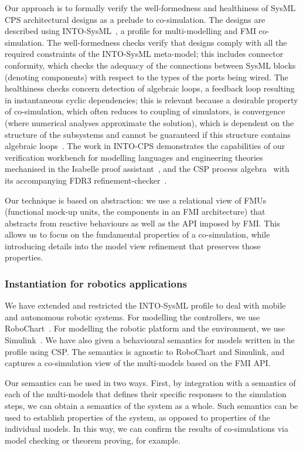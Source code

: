 Our approach is to formally verify the well-formedness and healthiness of SysML CPS architectural designs as a prelude to co-simulation. The designs are described using INTO-SysML~\cite{INTO-CPS-D2.1a-2015}, a profile for multi-modelling and FMI co-simulation. The well-formedness checks verify that designs comply with all the required constraints of the INTO-SysML meta-model; this includes connector conformity, which checks the adequacy of the connections between SysML blocks (denoting components) with respect to the types of the ports being wired. The healthiness checks concern detection of algebraic loops, a feedback loop resulting in instantaneous cyclic dependencies; this is relevant because a desirable property of co-simulation, which often reduces to coupling of simulators, is convergence (where numerical analyses approximate the solution), which is dependent on the structure of the subsystems and cannot be guaranteed if this structure contains algebraic loops~\cite{KublerS2000,BromanBGLMTW2013}. The work in INTO-CPS demonstrates the capabilities of our verification workbench for modelling languages and engineering theories mechanised in the Isabelle proof assistant~\cite{NipkowK2014}, and the CSP process algebra~\cite{Hoare1985} with its accompanying FDR3 refinement-checker~\cite{GibsonRobinsonABR2016}.

Our technique is based on abstraction: we use a relational view of FMUs (functional mock-up units, the components in an FMI architecture) that abstracts from reactive behaviours as well as the API imposed by FMI. This allows us to focus on the fundamental properties of a co-simulation, while introducing details into the model view refinement that preserves those properties.

\subsubsection{Instantiation for robotics applications}

We have extended and restricted the INTO-SysML profile to deal with mobile and autonomous robotic systems. For modelling the controllers, we use RoboChart~\cite{LiMRCWT2017}. For modelling the robotic platform and the environment, we use Simulink~\cite{MathworksURL}. We have also given a behavioural semantics for models written in the profile using CSP. The semantics is agnostic to RoboChart and Simulink, and captures a co-simulation view of the multi-models based on the FMI API.

Our semantics can be used in two ways. First, by integration with a semantics of each of the multi-models that defines their specific responses to the simulation steps, we can obtain a semantics of the system as a whole. Such semantics can be used to establish properties of the system, as opposed to properties of the individual models. In this way, we can confirm the results of co-simulations via model checking or theorem proving, for example.

